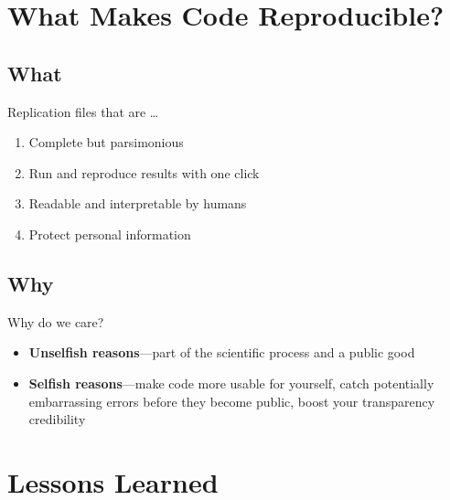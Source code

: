 \documentclass[12pt, compress]{beamer} %
\let\olditem\item %
\renewcommand{\item}{%
\olditem\vspace{\fill}}
\begin{document}
\section{What Makes Code Reproducible?}

\subsection{What}
	\begin{frame}{Replication files that are \dots}
		\begin{enumerate}
			\item Complete but parsimonious
			\item Run and reproduce results with one click
			\item Readable and interpretable by humans
			\item Protect personal information
		\end{enumerate}
	\end{frame}

\subsection{Why}		
	\begin{frame}{Why do we care?}
		\begin{itemize}
			\item \textbf{Unselfish reasons}---part of the scientific process and a public good
			\item \textbf{Selfish reasons}---make code more usable for yourself, catch potentially embarrassing errors before they become public, boost your transparency credibility
		\end{itemize}
		
	\end{frame}
	

\section{Lessons Learned}
\end{document}
